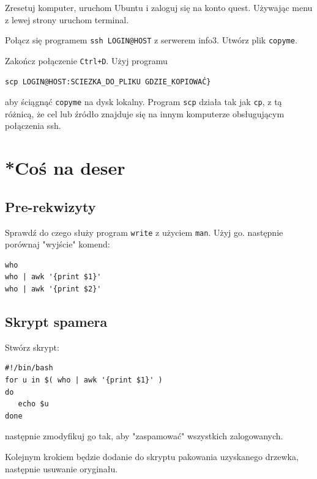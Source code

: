 \documentclass[landscape]{article}
\begin{document}
Zresetuj komputer, uruchom Ubuntu i zaloguj się na konto quest. Używając menu z lewej strony uruchom terminal.

Połącz się programem {\tt ssh LOGIN@HOST} z serwerem info3. Utwórz plik {\tt copyme}.

Zakończ połączenie {\tt Ctrl+D}. Użyj programu 

\begin{verbatim}
scp LOGIN@HOST:SCIEZKA_DO_PLIKU GDZIE_KOPIOWAĆ} 
\end{verbatim}

aby ściągnąć {\tt copyme} na dysk lokalny. Program {\tt scp} działa tak jak {\tt cp}, z tą różnicą, że cel lub źródło znajduje się na innym komputerze obsługującym połączenia ssh.

\section{*Coś na deser}

\subsection{Pre-rekwizyty}
Sprawdź do czego służy program {\tt write} z użyciem {\tt man}. Użyj go. następnie porównaj "wyjście" komend: 
\begin{verbatim}
who
who | awk '{print $1}'
who | awk '{print $2}'
\end{verbatim}

\subsection{Skrypt spamera}

Stwórz skrypt:
\begin{verbatim}
#!/bin/bash
for u in $( who | awk '{print $1}' )
do
   echo $u
done
\end{verbatim}

następnie zmodyfikuj go tak, aby "zaspamować" wszystkich zalogowanych.

Kolejnym krokiem będzie dodanie do skryptu pakowania uzyskanego drzewka, następnie usuwanie oryginału.
\end{document}
